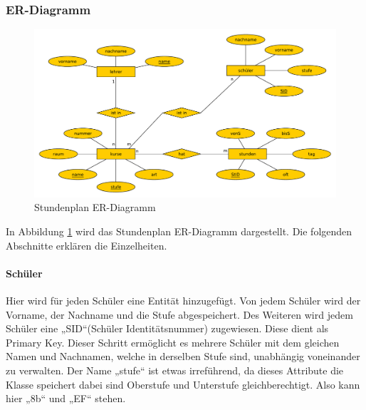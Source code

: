 \documentclass[a4paper, 12pt]{article}
\theoremstyle{plain}
\theoremstyle{definition}
\begin{document}
	\subsubsection{ER-Diagramm}
	\label{sec:ERDia}
	\begin{figure}[h]
	\includegraphics[scale=0.5]{ERStund.pdf}
	\caption{Stundenplan ER-Diagramm}
	\label{fig:ERStund}
	\end{figure}
In Abbildung \ref{fig:ERStund} wird das Stundenplan ER-Diagramm dargestellt. Die folgenden Abschnitte erklären die Einzelheiten.
\paragraph{Schüler}Hier wird für jeden Schüler eine Entität hinzugefügt. Von jedem Schüler wird der Vorname, der Nachname und die Stufe abgespeichert. Des Weiteren wird jedem Schüler eine „SID“(Schüler Identitätsnummer) zugewiesen. Diese dient als Primary Key. Dieser Schritt ermöglicht es mehrere Schüler mit dem gleichen Namen und Nachnamen, welche in derselben Stufe sind, unabhängig voneinander zu verwalten. Der Name „stufe“ ist etwas irreführend, da dieses Attribute die Klasse speichert dabei sind Oberstufe und Unterstufe gleichberechtigt. Also kann hier „8b“ und „EF“ stehen.

\end{document}
